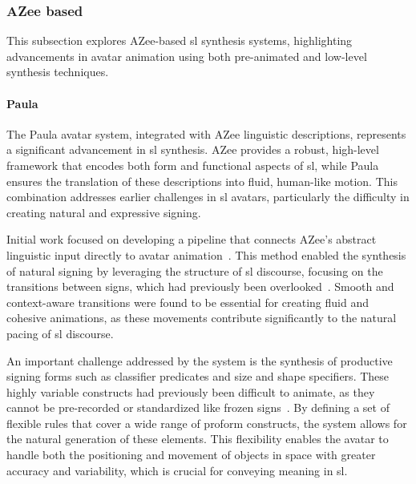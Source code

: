 \documentclass[../../main.tex]{subfiles}
\begin{document}
\subsubsection{AZee based}
\label{ch:background_work:sign_language_synthesis:3d_techniques:sign_language_synthesis_systems:azee_based}

This subsection explores AZee-based \gls{sl} synthesis systems, highlighting advancements in avatar animation using both pre-animated and low-level synthesis techniques.

\paragraph{Paula}
\label{ch:background_work:sign_language_synthesis:3d_techniques:sign_language_synthesis_systems:azee_based:paula}

The Paula avatar system, integrated with AZee linguistic descriptions, represents a significant advancement in \gls{sl} synthesis. AZee provides a robust, high-level framework that encodes both form and functional aspects of \gls{sl}, while Paula ensures the translation of these descriptions into fluid, human-like motion. This combination addresses earlier challenges in \gls{sl} avatars, particularly the difficulty in creating natural and expressive signing.

Initial work focused on developing a pipeline that connects AZee's abstract linguistic input directly to avatar animation~\cite{filhol2017synthesizing}. This method enabled the synthesis of natural signing by leveraging the structure of \gls{sl} discourse, focusing on the transitions between signs, which had previously been overlooked~\cite{mcdonald2021natural}. Smooth and context-aware transitions were found to be essential for creating fluid and cohesive animations, as these movements contribute significantly to the natural pacing of \gls{sl} discourse.

An important challenge addressed by the system is the synthesis of productive signing forms such as classifier predicates and size and shape specifiers. These highly variable constructs had previously been difficult to animate, as they cannot be pre-recorded or standardized like frozen signs~\cite{filhol2020synthesis}. By defining a set of flexible rules that cover a wide range of proform constructs, the system allows for the natural generation of these elements. This flexibility enables the avatar to handle both the positioning and movement of objects in space with greater accuracy and variability, which is crucial for conveying meaning in \gls{sl}.
\end{document}
